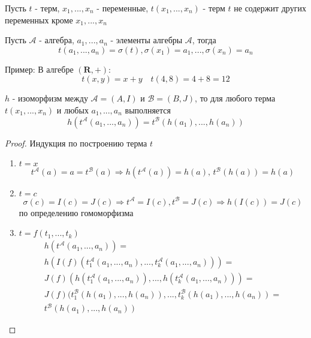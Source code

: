 \documentclass[../main/document.tex]{subfiles}
\begin{document}
\begin{dfn}
Пусть $t$ - терм, $x_1,...,x_n$ - переменные, $t(x_1,...,x_n)$ - терм $t$ не содержит других переменных кроме $x_1,...,x_n$
\end{dfn}
\begin{dfn}
Пусть $\mathcal{A}$ - алгебра, $a_1,...,a_n$ - элементы алгебры $\mathcal{A}$, тогда
$$t(a_1,...,a_n)=\sigma(t), \sigma(x_1)=a_1,...,\sigma(x_n)=a_n$$

Пример:
В алгебре $(\mathbf{R},+)$:
$$t(x,y)=x+y\quad t(4,8)=4+8=12$$
\end{dfn}
\begin{thm}
$h$ - изоморфизм между $\mathcal{A}=(A,I)$ и $\mathcal{B}=(B,J)$, то для любого терма $t(x_1,...,x_n)$ и любых $a_1,...,a_n$ выполняется
$$h(t^{\mathcal{A}}(a_1,...,a_n))=t^{\mathcal{B}}(h(a_1),...,h(a_n))$$
\begin{proof}
Индукция по построению терма $t$
\begin{enumerate}
\item $t=x$
$$t^{\mathcal{A}}(a)=a=t^{\mathcal{B}}(a)\Rightarrow h(t^{\mathcal{A}}(a))=h(a),\, t^{\mathcal{B}}(h(a))=h(a)$$
\item $t=c$
$$\sigma(c)=I(c)=J(c)\Rightarrow t^{\mathcal{A}}=I(c), t^{\mathcal{B}}=J(c)\Rightarrow h(I(c))=J(c)$$
по определению гомоморфизма
\item $t=f(t_1,...,t_k)$
\begin{multline*}
h(t^{\mathcal{A}}(a_1,...,a_n))=\\
h(I(f)(t^{\mathcal{A}}_{1}(a_1,...,a_n),...,t^{\mathcal{A}}_{k}(a_1,...,a_n)))=\\
J(f)(h(t^{\mathcal{A}}_{1}(a_1,...,a_n)),...,h(t^{\mathcal{A}}_{k}(a_1,...,a_n)))=\\
J(f)(t^{\mathcal{B}}_{1}(h(a_1),...,h(a_n)),...,t^{\mathcal{B}}_{k}(h(a_1),...,h(a_n))=\\
t^{\mathcal{B}}(h(a_1),...,h(a_n))
\end{multline*}
\end{enumerate}
\end{proof}
\end{thm}
\end{document}
